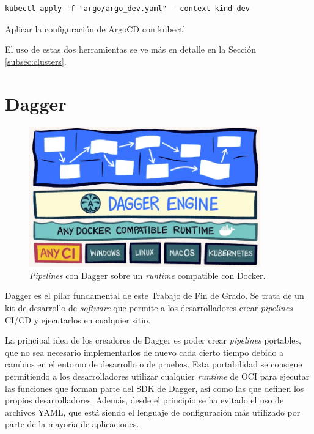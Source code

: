 \begin{listing}[!ht]
  \begin{verbatim}
kubectl apply -f "argo/argo_dev.yaml" --context kind-dev
  \end{verbatim}
    \caption{Aplicar la configuración de ArgoCD con kubectl}
    \label{lst:kubectl}
\end{listing}

El uso de estas dos herramientas se ve más en detalle en la Sección \ref{subsec:clusters}.

\section{Dagger}

\begin{figure}
  \centerline{\includegraphics[width=10cm]{figuras/dagger}}
  \caption{\textit{Pipelines} con Dagger sobre un \textit{runtime} compatible con Docker\cite{img:dagger}.}
  \label{fig:dagger}
\end{figure}

Dagger es el pilar fundamental de este Trabajo de Fin de Grado. Se trata de un kit de desarrollo de \textit{software} que permite a los desarrolladores crear \textit{pipelines} CI/CD y ejecutarlos en cualquier sitio.

La principal idea de los creadores de Dagger es poder crear \textit{pipelines} portables, que no sea necesario implementarlos de nuevo cada cierto tiempo debido a cambios en el entorno de desarrollo o de pruebas. Esta portabilidad se consigue permitiendo a los desarrolladores utilizar cualquier \textit{runtime} de OCI para ejecutar las funciones que forman parte del SDK\cite{sdk} de Dagger, así como las que definen los propios desarrolladores. Además, desde el principio se ha evitado el uso de archivos YAML, que está siendo el lenguaje de configuración más utilizado por parte de la mayoría de aplicaciones.


